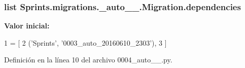 \subsubsection[{\texorpdfstring{dependencies}{dependencies}}]{\setlength{\rightskip}{0pt plus 5cm}list Sprints.\+migrations.\+\_\+auto\+\_\+\_.\+Migration.\+dependencies\hspace{0.3cm}{\ttfamily [static]}}\hypertarget{class_sprints_1_1migrations_1_10004__auto__20160630__1356_1_1_migration_a9cb705640fcc4ce3923b4dcc06719f06}{}\label{class_sprints_1_1migrations_1_10004__auto__20160630__1356_1_1_migration_a9cb705640fcc4ce3923b4dcc06719f06}
{\bfseries Valor inicial\+:}
\begin{DoxyCode}
1 = [
2         (\textcolor{stringliteral}{'Sprints'}, \textcolor{stringliteral}{'0003\_auto\_20160610\_2303'}),
3     ]
\end{DoxyCode}


Definición en la línea 10 del archivo 0004\+\_\+auto\+\_\+\_.\+py.

